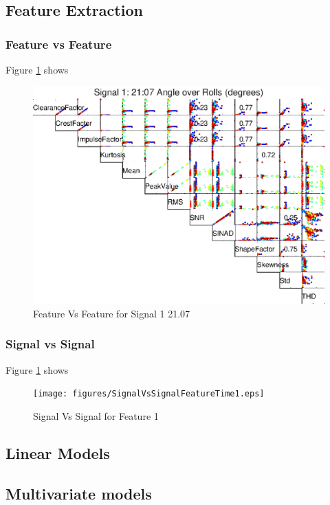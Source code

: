 \documentclass{article}
\begin{document}
\subsection{Feature Extraction}

\subsubsection{Feature vs Feature}
Figure \ref{fig:FeatureVsFeatureSignal1} shows 
\begin{figure}[H]
    \centering
    \includegraphics[width=\textwidth, height=\textheight, keepaspectratio]{figures/FeatureVsFeatureSignal1.eps}
    \caption{Feature Vs Feature for Signal 1 21.07}
    \label{fig:FeatureVsFeatureSignal1}
\end{figure}

\subsubsection{Signal vs Signal}
Figure \ref{fig:FeatureVsFeatureSignal1} shows 
\begin{figure}[H]
    \centering
    \texttt{[image: figures/SignalVsSignalFeatureTime1.eps]}
    \caption{Signal Vs Signal for Feature 1}
    \label{fig:SignalVsSignalFeature1}
\end{figure}
\subsection{Linear Models}

\subsection{Multivariate models}
\end{document}
